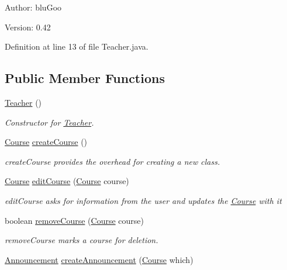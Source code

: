 \begin{Desc}
\item[Author:]bluGoo \end{Desc}
\begin{Desc}
\item[Version:]0.42 \end{Desc}


Definition at line 13 of file Teacher.java.\subsection*{Public Member Functions}
\begin{CompactItemize}
\item 
\hyperlink{classTeacher_f3008b8968c2cc6edc1c742cb7363c6b}{Teacher} ()
\begin{CompactList}\small\item\em Constructor for \hyperlink{classTeacher}{Teacher}. \item\end{CompactList}\item 
\hyperlink{classCourse}{Course} \hyperlink{classTeacher_99eda3ecbd084e16e1c3aee44f15b7fb}{createCourse} ()
\begin{CompactList}\small\item\em createCourse provides the overhead for creating a new class. \item\end{CompactList}\item 
\hyperlink{classCourse}{Course} \hyperlink{classTeacher_96b4f128632f448448cc2709693d0364}{editCourse} (\hyperlink{classCourse}{Course} course)
\begin{CompactList}\small\item\em editCourse asks for information from the user and updates the \hyperlink{classCourse}{Course} with it \item\end{CompactList}\item 
boolean \hyperlink{classTeacher_84380b3ae21b6eb70b116db75378acfc}{removeCourse} (\hyperlink{classCourse}{Course} course)
\begin{CompactList}\small\item\em removeCourse marks a course for deletion. \item\end{CompactList}\item 
\hyperlink{classAnnouncement}{Announcement} \hyperlink{classTeacher_f301f7cf4ee9bda24caea174ba1bfd13}{createAnnouncement} (\hyperlink{classCourse}{Course} which)

\end{CompactItemize}
